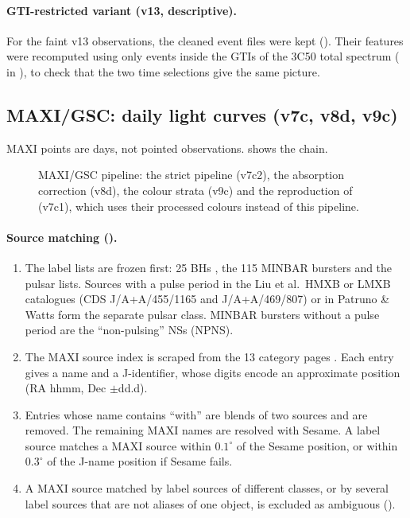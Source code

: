\paragraph{GTI-restricted variant (v13, descriptive).} For the faint v13 observations, the cleaned event files were kept
(). Their features were recomputed using only events inside the GTIs of the 3C50 total spectrum
( in ), to check that the two time selections give the same picture.

\subsection{MAXI/GSC: daily light curves (v7c, v8d, v9c)}\label{sec:maxi}
MAXI points are days, not pointed observations.  shows the chain.

\begin{figure}[htbp]
\centering

\caption{MAXI/GSC pipeline: the strict pipeline (v7c2), the absorption correction (v8d), the colour strata (v9c) and the
reproduction of \citet{deBeurs2022} (v7c1), which uses their processed colours instead of this pipeline.}\label{fig:maxiflow}
\end{figure}

\paragraph{Source matching ().}
\begin{enumerate}
\item The label lists are frozen first: 25 BHs \citep{Marcel2026}, the 115 MINBAR bursters and the pulsar lists. Sources
with a pulse period in the Liu et al.\ HMXB or LMXB catalogues (CDS J/A+A/455/1165 and J/A+A/469/807) or in Patruno \&
Watts form the separate pulsar class. MINBAR bursters without a pulse period are the ``non-pulsing'' NSs (NPNS).
\item The MAXI source index is scraped from the 13 category pages . Each entry
gives a name and a J-identifier, whose digits encode an approximate position (RA hhmm, Dec $\pm$dd.d).
\item Entries whose name contains ``with'' are blends of two sources and are removed. The remaining MAXI names are resolved
with Sesame. A label source matches a MAXI source within $0.1^\circ$ of the Sesame position, or within $0.3^\circ$ of the
J-name position if Sesame fails.
\item A MAXI source matched by label sources of different classes, or by several label sources that are not aliases of one
object, is excluded as ambiguous ().
\end{enumerate}

